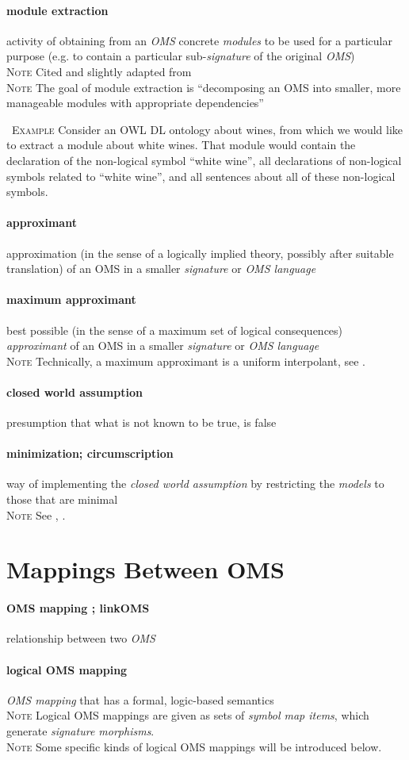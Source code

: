 \documentclass[10pt,%
\ifpretendfinal
final%
\else
draft%
\fi,
]{scrreprt}
\makeatletter
\newcommand*{\eg}{e.g.\@\xspace}
\newcommand*{\termref}[1]{\textit{#1}}
\newcommand*{\subjectfield}[1]{ {\textlangle}#1{\textrangle}}
\newcommand*{\synonym}{; }
\newcommand{\sclause}[1]{\section{#1}}
\newcommand{\termdefinition}[2]{\paragraph{#1} #2}
\renewcommand{\subjectfield}[1]{#1}
\newenvironment{definitions}[0]{\medskip }{}
\newenvironment{note}[0]{\ \\ \textsc{Note} \quad}{}
\newenvironment{example}[0]{\ \newline \textsc{Example}\quad }{}
\makeatother
\begin{document}
\begin{definitions}
  \termdefinition{module extraction}{activity of obtaining from an \termref{OMS} concrete \termref{modules} to be used for a particular purpose (\eg to contain a particular sub-\termref{signature} of the original \termref{OMS})}
  \begin{note}
    Cited and slightly adapted from \cite{SuarezFigueroaEtAl:OntologyGlossary2008}
  \end{note}
  \begin{note}
The goal of module extraction is ``decomposing an OMS into smaller, more manageable modules with
appropriate dependencies'' \cite{DBLP:series/lncs/5445}
  \end{note}

  \begin{example}
Consider an OWL DL ontology about wines, from which we would like to extract a module about white 
wines. That module would contain the declaration of the non-logical symbol ``white wine'', all 
declarations of non-logical symbols related to ``white wine'', and all sentences about all of these 
non-logical symbols.
  \end{example}


\termdefinition{approximant}{approximation (in the sense of a logically implied theory, possibly 
after suitable translation)  of an OMS in a smaller \termref{signature} or
\termref{OMS language}}
\termdefinition{maximum approximant}{
best possible (in the sense of a maximum set of logical consequences)
\termref{approximant} of an OMS in a smaller \termref{signature} or \termref{OMS language}}
\begin{note}
 Technically, a maximum approximant is a uniform interpolant, see \cite{DBLP:conf/ijcai/LutzW11}.
\end{note}


\termdefinition{closed world assumption}{presumption that what is not known to be true, is false}

\termdefinition{minimization\synonym circumscription}
{way of implementing the \termref{closed world assumption} by restricting the \termref{models} to those that are minimal}
  \begin{note}
    See \cite{circ1}, \cite{circ2}.
  \end{note}

\sclause{Mappings Between OMS}

   \termdefinition{OMS mapping \synonym link\subjectfield{OMS}}{relationship between two \termref{OMS}}
  
  \termdefinition{logical OMS mapping}{\termref{OMS mapping} that has a formal, logic-based semantics}
  \begin{note}
    Logical OMS mappings are given as sets of \termref{symbol map items}, which generate \emph{signature morphisms}.
  \end{note}
  \begin{note}
Some specific kinds of logical OMS mappings will be introduced below.  
  \end{note}


\end{definitions}
\end{document}
